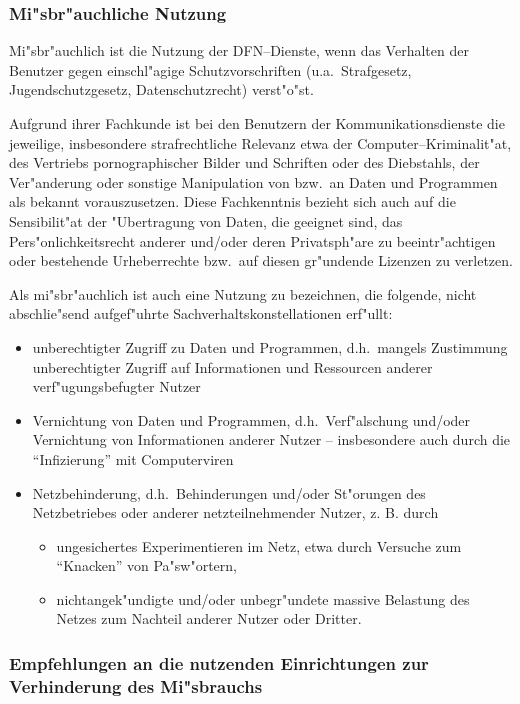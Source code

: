 \subsubsection{Mi"sbr"auchliche Nutzung}

Mi"sbr"auchlich ist die Nutzung der DFN--Dienste, wenn das Verhalten der
Benutzer gegen einschl"agige Schutzvorschriften (u.a.\  Strafgesetz,
Jugendschutzgesetz, Datenschutzrecht) verst"o"st.

Aufgrund ihrer Fachkunde ist bei den Benutzern der Kommunikationsdienste die
jeweilige, insbesondere strafrechtliche Relevanz etwa der
Computer--Kriminalit"at, des Vertriebs pornographischer Bilder und Schriften
oder des Diebstahls, der Ver"anderung oder sonstige Manipulation von bzw.\  an
Daten und Programmen als bekannt vorauszusetzen. Diese Fachkenntnis bezieht
sich auch auf die Sensibilit"at der "Ubertragung von Daten, die geeignet sind,
das Pers"onlichkeitsrecht anderer und/oder deren Privatsph"are zu
beeintr"achtigen oder bestehende Urheberrechte bzw.\  auf diesen gr"undende
Lizenzen zu verletzen.

Als mi"sbr"auchlich ist auch eine Nutzung zu bezeichnen, die folgende, nicht
abschlie"send aufgef"uhrte Sachverhaltskonstellationen erf"ullt:

\begin{itemize}
  \item unberechtigter Zugriff zu Daten und Programmen, d.h.\  mangels
    Zustimmung unberechtigter Zugriff auf Informationen und Ressourcen
    anderer verf"ugungsbefugter Nutzer
  \item Vernichtung von Daten und Programmen, d.h.\  Verf"alschung und/oder
    Vernichtung von Informationen anderer Nutzer -- insbesondere auch durch
    die "`Infizierung"' mit Computerviren
  \item Netzbehinderung, d.h.\  Behinderungen und/oder St"orungen des
    Netzbetriebes oder anderer netzteilnehmender Nutzer, z. B. durch
    \begin{itemize}
      \item ungesichertes Experimentieren im Netz, etwa durch Versuche zum
        "`Knacken"' von Pa"sw"ortern,
      \item nichtangek"undigte und/oder unbegr"undete massive Belastung des
        Netzes zum Nachteil anderer Nutzer oder Dritter.
    \end{itemize}
\end{itemize}

\subsubsection{Empfehlungen an die nutzenden Einrichtungen zur Verhinderung des
Mi"sbrauchs}

